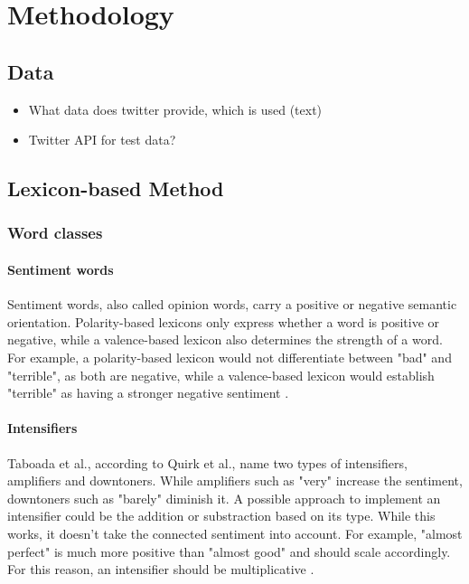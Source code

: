 \chapter{Methodology}
\label{cha:Chapter4_Methodology}

\section{Data}
\begin{itemize}
    \item What data does twitter provide, which is used (text)
    \item Twitter API for test data?
\end{itemize}

\section{Lexicon-based Method}

\subsection{Word classes}

\subsubsection{Sentiment words}
Sentiment words, also called opinion words, carry a positive or negative semantic orientation. Polarity-based lexicons only express whether a word is positive or negative, while a valence-based lexicon also determines the strength of a word. For example, a polarity-based lexicon would not differentiate between "bad" and "terrible", as both are negative, while a valence-based lexicon would establish "terrible" as having a stronger negative sentiment \cite{DBLP:conf/icwsm/HuttoG14}.

\subsubsection{Intensifiers}

Taboada et al., according to Quirk et al., name two types of intensifiers, amplifiers and downtoners. While amplifiers such as "very" increase the  sentiment, downtoners such as "barely" diminish it. A possible approach to implement an intensifier could be the addition or substraction based on its type. While this works, it doesn't take the connected sentiment into account. For example, "almost perfect" is much more positive than "almost good" and should scale accordingly. For this reason, an intensifier should be multiplicative \cite{10.1162/COLI_a_00049}.

